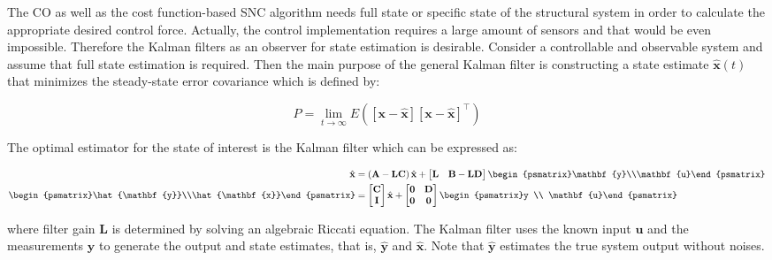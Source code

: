 The CO as well as the cost function-based SNC algorithm needs full state or specific state of the structural system in order to calculate the appropriate desired control force. Actually, the control implementation requires a large amount of sensors and that would be even impossible. Therefore the Kalman filters as an observer for state estimation is desirable. Consider a controllable and observable system and assume that full state estimation is required. Then the main purpose of the general Kalman filter is constructing a state estimate $\hat{\mathbf{x}}(t)$ that minimizes the steady-state error  covariance which is defined by:

\begin{equation}\label{eq:n3-13}
P = \lim_{t\to\infty} E\left(\left[ \mathbf{x} - \hat{\mathbf{x}} \right] \left[ \mathbf{x} - \hat{\mathbf{x}} \right]^{\top}\right)
\end{equation}

The optimal estimator for the state of interest is the Kalman filter which can be expressed as:

\begin{equation}\label{eq:n3-14}
\begin{aligned}
\hat{\mathbf{x}} &= \left(\mathbf{A}-\mathbf{LC}\right)\hat{\mathbf{x}} + \begin{bmatrix}\mathbf{L} & \mathbf{B}-\mathbf{LD}\end{bmatrix} \begin{psmatrix}\mathbf{y}\\\mathbf{u}\end{psmatrix} \\
\begin{psmatrix}\hat{\mathbf{y}}\\\hat{\mathbf{x}}\end{psmatrix} & = \begin{bmatrix}\mathbf{C} \\ \mathbf{I}\end{bmatrix}\hat{\mathbf{x}} + \begin{bmatrix}\mathbf{0} & \mathbf{D}\\ \mathbf{0} & \mathbf{0}\end{bmatrix}\begin{psmatrix}y \\ \mathbf{u}\end{psmatrix}
\end{aligned}
\end{equation}

where filter gain $\mathbf{L}$  is determined by solving an algebraic Riccati equation. The Kalman filter uses the known input $\mathbf{u}$ and the measurements $\mathbf{y}$ to generate the output and state estimates, that is, $\hat{\mathbf{y}}$ and $\hat{\mathbf{x}}$. Note that $\hat{\mathbf{y}}$  estimates the true system output without
noises.

